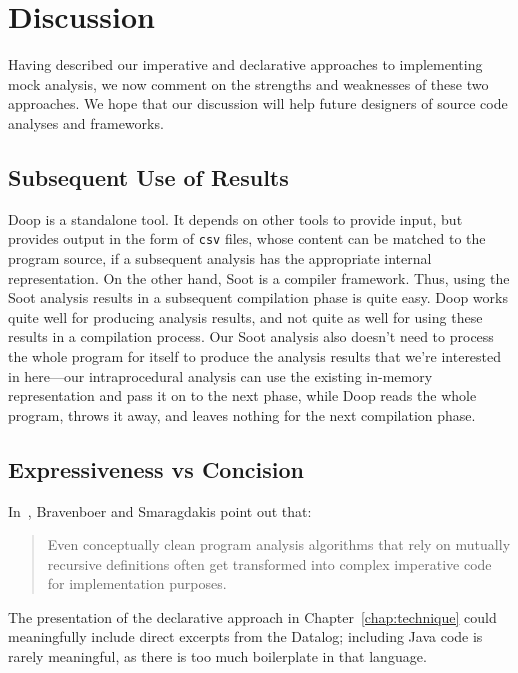 \chapter{Discussion}
\label{chap:discussion}

Having described our imperative and declarative approaches to implementing mock analysis, we now comment on the strengths and weaknesses of these two approaches. We hope that our discussion will help future designers of source code analyses and frameworks.

\section{Subsequent Use of Results} 

Doop is a standalone tool. It depends on other tools to provide input, but provides output in the form of \texttt{csv} files, whose content can be matched to the program source, if a subsequent analysis has the appropriate internal representation. On the other hand, Soot is a compiler framework. Thus, using the Soot analysis results in a subsequent compilation phase is quite easy. Doop works quite well for producing analysis results, and not quite as well for using these results in a compilation process. Our Soot analysis also doesn't need to process the whole program for itself to produce the analysis results that we're interested in here---our intraprocedural analysis can use the existing in-memory representation and pass it on to the next phase, while Doop reads the whole program, throws it away, and leaves nothing for the next compilation phase. 

\section{Expressiveness vs Concision}

In~\cite{bravenboer09:_stric_declar_specif_sophis_point_analy}, Bravenboer and Smaragdakis point out that:
\begin{quote}
	Even conceptually clean program analysis algorithms that
	rely on mutually recursive definitions often get transformed
	into complex imperative code for implementation purposes.
\end{quote}
The presentation of the declarative approach in Chapter~\ref{chap:technique} could meaningfully include direct excerpts from the Datalog; including Java code is rarely meaningful, as there is too much boilerplate in that language.

